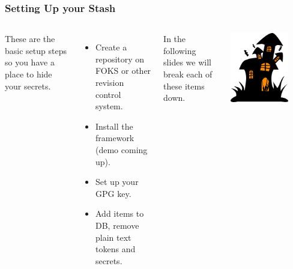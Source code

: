 \documentclass[aspectratio=169]{beamer}
\begin{document}
\begin{frame}
    \frametitle{Setting Up your Stash}

    \begin{columns}
    These are the basic setup steps so you have a place to hide your secrets.
    \begin{itemize}
        \item Create a repository on FOKS or other revision control system.
        \item Install the framework (demo coming up).
        \item Set up your GPG key.
        \item Add items to DB, remove plain text tokens and secrets.
    \end{itemize}
    In the following slides we will break each of these items down.

    \includegraphics[width=0.75\textwidth]{../static/images/new_logo.png}
    \end{columns}
\end{frame}
\end{document}
